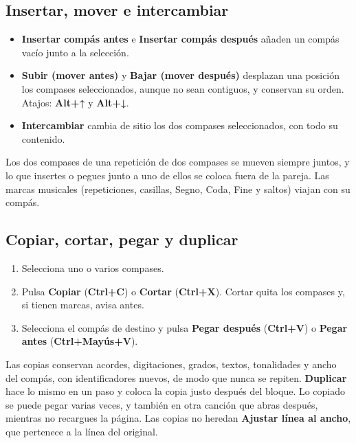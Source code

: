 \documentclass[a4paper,11pt]{article}
\providecommand{\tightlist}{\setlength{\itemsep}{2pt}\setlength{\parskip}{0pt}}
\begin{document}
\subsection{Insertar, mover e
intercambiar}\label{insertar-mover-e-intercambiar}

\begin{itemize}
\tightlist
\item
  \textbf{Insertar compás antes} e \textbf{Insertar compás después}
  añaden un compás vacío junto a la selección.
\item
  \textbf{Subir (mover antes)} y \textbf{Bajar (mover después)}
  desplazan una posición los compases seleccionados, aunque no sean
  contiguos, y conservan su orden. Atajos: \textbf{Alt+↑} y
  \textbf{Alt+↓}.
\item
  \textbf{Intercambiar} cambia de sitio los dos compases seleccionados,
  con todo su contenido.
\end{itemize}

Los dos compases de una repetición de dos compases se mueven siempre
juntos, y lo que insertes o pegues junto a uno de ellos se coloca fuera
de la pareja. Las marcas musicales (repeticiones, casillas, Segno, Coda,
Fine y saltos) viajan con su compás.

\subsection{Copiar, cortar, pegar y
duplicar}\label{copiar-cortar-pegar-y-duplicar}

\begin{enumerate}
\def\labelenumi{\arabic{enumi}.}
\tightlist
\item
  Selecciona uno o varios compases.
\item
  Pulsa \textbf{Copiar} (\textbf{Ctrl+C}) o \textbf{Cortar}
  (\textbf{Ctrl+X}). Cortar quita los compases y, si tienen marcas,
  avisa antes.
\item
  Selecciona el compás de destino y pulsa \textbf{Pegar después}
  (\textbf{Ctrl+V}) o \textbf{Pegar antes} (\textbf{Ctrl+Mayús+V}).
\end{enumerate}

Las copias conservan acordes, digitaciones, grados, textos, tonalidades
y ancho del compás, con identificadores nuevos, de modo que nunca se
repiten. \textbf{Duplicar} hace lo mismo en un paso y coloca la copia
justo después del bloque. Lo copiado se puede pegar varias veces, y
también en otra canción que abras después, mientras no recargues la
página. Las copias no heredan \textbf{Ajustar línea al ancho}, que
pertenece a la línea del original.
\end{document}
